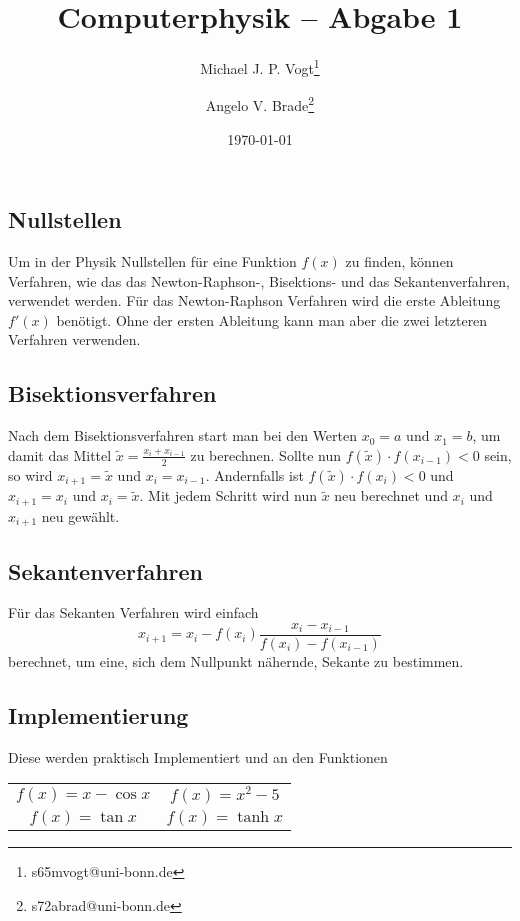 \documentclass[10pt]{article}
\title{Computerphysik -- Abgabe 1}
\author[1]{Michael J. P. Vogt\thanks{s65mvogt@uni-bonn.de}}
\author[1]{Angelo V. Brade\thanks{s72abrad@uni-bonn.de}}
\affil[1]{Rhenish Friedrich Wilhelm University of Bonn}
\date{\today}
\begin{document}
\maketitle
\newpage

\tableofcontents
\newpage


\pagestyle{fancy}
\fancyhead[R]{\thepage}
\fancyhead[L]{\leftmark}

\begin{multicols}{2}
  \section{Nullstellen} \label{sec:nullstellen}
  Um in der Physik Nullstellen für eine Funktion \(
    f(x)
    \) zu finden, können Verfahren, wie das das Newton-Raphson-, Bisektions- und das Sekantenverfahren, verwendet werden. Für das Newton-Raphson Verfahren wird die erste Ableitung \(f'(x)\) benötigt. Ohne der ersten Ableitung kann man aber die zwei letzteren Verfahren verwenden.
  \subsection{Bisektionsverfahren}
  Nach dem Bisektionsverfahren start man bei den Werten \(x_0=a\textrm{ und }x_1=b\), um damit das Mittel \(\tilde{x}=\frac{x_i+x_{i-1}}{2}\) zu berechnen. Sollte nun \(f(\tilde{x})\cdot f(x_{i-1}) < 0\) sein, so wird \(x_{i+1}=\tilde{x}\) und \(x_i=x_{i-1}\). Andernfalls ist \(f(\tilde{x})\cdot f(x_{i}) < 0\) und \(x_{i+1}=x_i\) und \(x_i=\tilde{x}\). Mit jedem Schritt wird nun \(\tilde{x}\) neu berechnet und \(x_i\) und \(x_{i+1}\) neu gewählt.
  \subsection{Sekantenverfahren}
  Für das Sekanten Verfahren wird einfach 
\begin{equation}
  x_{i+1}=x_i-f(x_i)\frac{x_i-x_{i-1}}{f(x_i)-f(x_{i-1})}
\end{equation} 
   berechnet, um eine, sich dem Nullpunkt nähernde, Sekante zu bestimmen.
\subsection{Implementierung}

  Diese werden praktisch Implementiert und an den Funktionen

\begin{tabular}{p{3.2cm}p{3.2cm}}
  \begin{equation}
    f(x)=x-\cos{x}
  \end{equation}
  &
  \begin{equation}
    f(x)=x^2-5
  \end{equation}\\
  \begin{equation}
    f(x)=\tan{x}
  \end{equation}
  &
  \begin{equation}
    f(x)=\tanh{x}
  \end{equation}
\end{tabular}


\end{multicols}
\end{document}
